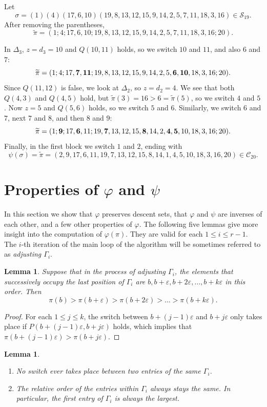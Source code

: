 \documentclass[11pt]{amsart}
\newtheorem{lemma}[theorem]{Lemma}
\newcounter{Examplecount}
\newenvironment{example}[1][Example \arabic{Examplecount}.]{\vskip3pt \begin{trivlist}
\item[\hskip \labelsep {\bfseries #1}]}{\end{trivlist}\vskip2pt\stepcounter{Examplecount}}
\newcommand\ben{\begin{enumerate}}
\newcommand\een{\end{enumerate}}
\renewcommand\S{\mathcal S}
\newcommand\C{\mathcal C}
\newcommand\wt{\widetilde}
\newcommand\bij{\varphi}
\newcommand\inv{\psi}
\newcommand\eps{\varepsilon}
\newcommand\pim{\wt\pi}
\begin{document}
\begin{example}
Let $$\sigma=(1)(4)(17,6,10)(19,8,13,12,15,9,14,2,5,7,11,18,3,16)\in\S_{19}.$$
After removing the parentheses, $$\pim=(1;4;17,6,10;19,8,13,12,15,9,14,2,5,7,11,18,3,16;20).$$

In $\Delta_3$, $z=d_3=10$ and $Q(10,11)$ holds, so we switch $10$ and $11$, and also $6$ and $7$:
$$\pim=(1;4;17,{\bf 7},{\bf 11};19,8,13,12,15,9,14,2,5,{\bf 6},{\bf 10},18,3,16;20).$$
Since $Q(11,12)$ is false, we look at $\Delta_2$, so $z=d_2=4$. We see that both $Q(4,3)$ and $Q(4,5)$ hold, but $\pim(3)=16>6=\pim(5)$, so we switch $4$ and $5$.
Now $z=5$ and $Q(5,6)$ holds, so we switch $5$ and $6$. Similarly, we switch $6$ and $7$, next $7$ and $8$, and then $8$ and $9$:
$$\pim=(1;{\bf 9};17,{\bf 6},11;19,{\bf 7},13,12,15,{\bf 8},14,2,{\bf 4},{\bf 5},10,18,3,16;20).$$
Finally, in the first block we switch $1$ and $2$, ending with
$$\inv(\sigma)=\pim=(2,9,17,6,11,19,7,13,12,15,8,14,1,4,5,10,18,3,16,20)\in\C_{20}.$$
\end{example}


\section{Properties of $\bij$ and $\inv$}\label{sec:proof}
In this section we show that $\bij$ preserves descent sets, that $\bij$ and $\inv$ are inverses of each other, and a few other properties of $\bij$.
 The following five lemmas give more insight into the computation of $\bij(\pi)$. They are valid for each $1\le i\le r-1$.
The $i$-th iteration of the main loop of the algorithm will be sometimes referred to as {\em adjusting $\Gamma_i$}.

\begin{lemma}\label{lem:decrpi}
Suppose that in the process of adjusting $\Gamma_i$, the elements that successively occupy the last position of $\Gamma_i$ are $b,b+\eps,b+2\eps,\dots,b+k\eps$ in this order. Then
$$\pi(b)>\pi(b+\eps)>\pi(b+2\eps)>\dots>\pi(b+k\eps).$$
\end{lemma}

\begin{proof}
For each $1\le j\le k$, the switch between $b+(j{-}1)\eps$ and $b+j\eps$ only takes place if $P(b+(j{-}1)\eps,b+j\eps)$ holds, which implies that
$\pi(b+(j{-}1)\eps)>\pi(b+j\eps)$.
\end{proof}

\begin{lemma}\label{lem:relative} \ben \item\label{partt1} No switch ever takes place between two entries of the same $\Gamma_i$.
\item\label{partt2} The relative order of the entries within $\Gamma_i$ always stays the same. In particular, the first entry of $\Gamma_i$ is always the largest.
\een
\end{lemma}
\end{document}
